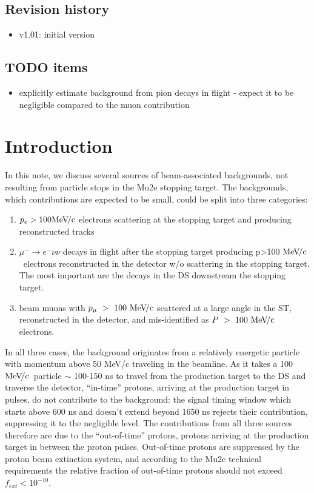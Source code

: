 \documentclass[12pt]{article}
\newcommand {\MeVc}       {\mbox{$\rm MeV\!/c$}}
\newcommand {\ra}        {\rightarrow}
\begin{document}
\subsection {Revision history} 
\begin{itemize}
\item
  v1.01: initial version
\end{itemize}
\subsection {TODO items}
\begin{itemize}
\item
  explicitly estimate background from pion decays in flight - expect it to
  be negligible compared to the muon contribution
\end{itemize}
\section {Introduction}

In this note, we discuss several sources of beam-associated backgrounds,
not resulting from particle stops in the Mu2e stopping target. 
The backgrounds, which contributions are expected to be small,
could be split into three categories:

\begin{enumerate}
\item 
  $p_e > 100 \MeVc$ electrons scattering at the stopping target and producing reconstructed tracks
\item
  $\mu^- \ra e^- \nu \nu$ decays in flight after the stopping target producing p>100 \MeVc\
  electrons reconstructed in the detector w/o scattering in the stopping target.
  The most important are the decays in the DS downstream the stopping target.
\item
  beam muons with  $p_\mu ~> ~100 ~\MeVc$ scattered at a large angle in the ST,
  reconstructed in the detector, and mis-identified as $P ~>~ 100 ~\MeVc$ electrons.
\end{enumerate}

In all three cases, the background originates from a relatively energetic particle with momentum
above 50 MeV/c traveling in the beamline. 
As it takes a 100 \MeVc\ particle $\sim$  100-150 ns to travel from the production target
to the DS and traverse the detector, ``in-time'' protons, arriving at the production target
in pulses, do not contribute to the background: the signal timing window which starts
above 600 ns and doesn't extend beyond 1650 ns rejects their contribution, suppressing
it to the negligible level. The contributions from all three sources therefore are due
to the ``out-of-time'' protons, protons arriving at the production target in between
the proton pulses. Out-of-time protons are suppressed by the proton beam extinction system,
and according to the Mu2e technical requirements the relative fraction of out-of-time protons
should not exceed $f_{ext} < 10^{-10}$.
\end{document}
